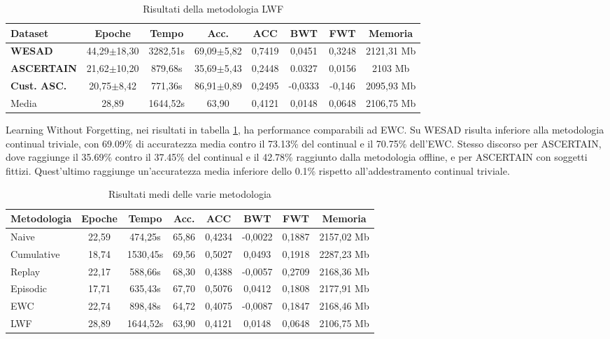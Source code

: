 \begin{table}[h]
\footnotesize
    \begin{tabular}{l|c|c|c|c|c|c|c}
        \textbf{Dataset} & \textbf{Epoche} & \textbf{Tempo} & \textbf{Acc.} & \textbf{ACC} & \textbf{BWT} & \textbf{FWT} & \textbf{Memoria}\\
        \hline
        \textbf{WESAD} & 44,29$\pm$18,30 & 3282,51s & 69,09$\pm$5,82 & 0,7419 & 0,0451 & 0,3248 & 2121,31 Mb\\
        \textbf{ASCERTAIN} & 21,62$\pm$10,20 & 879,68s & 35,69$\pm$5,43 & 0,2448 & 0.0327 & 0,0156 & 2103 Mb\\
        \textbf{Cust. ASC.} & 20,75$\pm$8,42 & 771,36s & 86,91$\pm$0,89 & 0,2495 & -0,0333 & -0,146 & 2095,93 Mb\\
        \hline
        Media & 28,89 & 1644,52s & 63,90 & 0,4121 & 0,0148 & 0,0648 & 2106,75 Mb
    \end{tabular}
    \caption{Risultati della metodologia LWF}
    \label{tab:reslwf}
\end{table}
Learning Without Forgetting, nei risultati in tabella \ref{tab:reslwf}, ha performance comparabili ad EWC. Su WESAD risulta inferiore alla metodologia continual triviale, con 69.09\% di accuratezza media contro il 73.13\% del continual e il 70.75\% dell'EWC. Stesso discorso per ASCERTAIN, dove raggiunge il 35.69\% contro il 37.45\% del continual e il 42.78\% raggiunto dalla metodologia offline, e per ASCERTAIN con soggetti fittizi. Quest'ultimo raggiunge un'accuratezza media inferiore dello 0.1\% rispetto all'addestramento continual triviale.

\begin{table}[h]
\footnotesize
    \begin{center}
        \begin{tabular}{l|c|c|c|c|c|c|c}
            \textbf{Metodologia} & \textbf{Epoche} & \textbf{Tempo} & \textbf{Acc.} & \textbf{ACC} & \textbf{BWT} & \textbf{FWT} & \textbf{Memoria}\\
            \hline
            Naive & 22,59 & 474,25s & 65,86 & 0,4234 & -0,0022 & 0,1887 & 2157,02 Mb\\
            Cumulative & 18,74 & 1530,45s & 69,56 & 0,5027 & 0,0493 & 0,1918 & 2287,23 Mb\\
            Replay & 22,17 & 588,66s & 68,30 & 0,4388 & -0,0057 & 0,2709 & 2168,36 Mb\\
            Episodic & 17,71 & 635,43s & 67,70 & 0,5076 & 0,0412 & 0,1808 & 2177,91 Mb\\
            EWC & 22,74 & 898,48s & 64,72 & 0,4075 & -0,0087 & 0,1847 & 2168,46 Mb\\
            LWF & 28,89 & 1644,52s & 63,90 & 0,4121 & 0,0148 & 0,0648 & 2106,75 Mb
        \end{tabular}
        \caption{Risultati medi delle varie metodologia}
        \label{tab:allres_mean}
    \end{center}
\end{table}